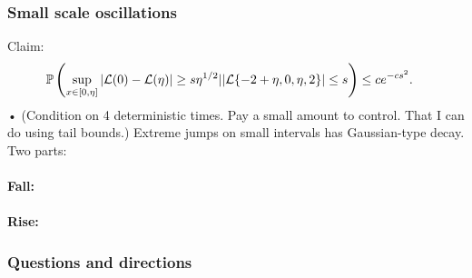 \subsubsection{Small scale oscillations}
Claim:
\begin{align*}
\mathbb{P}\left( {\sup_{x\in [0,\eta]} |\mathcal{L}(0)-\mathcal{L}(\eta)|\ge s\eta^{1/2}||\mathcal{L}\{-2+\eta,0,\eta,2\}|\le s} \right)
&\le ce^{-cs^2}.
\end{align*}•
(Condition on 4 deterministic times. Pay a small amount to control. That I can do using tail bounds.)
Extreme jumps on small intervals has Gaussian-type decay.
Two parts:

\paragraph{Fall:} %

\paragraph{Rise:}


\subsubsection{Questions and directions}

